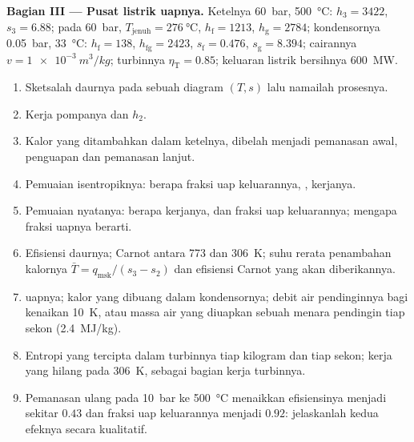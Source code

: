 \begin{problem}
\textbf{Bagian III --- Pusat listrik uapnya.}
Ketelnya \qty{60}{bar}, \qty{500}{\celsius}: $h_3 = 3422$, $s_3 = 6.88$; pada
\qty{60}{bar}, $T_{\text{jenuh}} = \qty{276}{\celsius}$, $h_{\text{f}} = 1213$,
$h_{\text{g}} = 2784$; kondensornya \qty{0.05}{bar}, \qty{33}{\celsius}:
$h_{\text{f}} = 138$, $h_{\text{fg}} = 2423$, $s_{\text{f}} = 0.476$, $s_{\text{g}} =
8.394$; cairannya $v = \qty{1e-3}{m^3/kg}$; turbinnya $\eta_{\text{T}} = 0.85$;
keluaran listrik bersihnya \qty{600}{MW}.
\begin{enumerate}[resume]
  \item Sketsalah daurnya pada sebuah diagram $(T,s)$ lalu namailah prosesnya.
  \item Kerja pompanya dan $h_2$.
  \item Kalor yang ditambahkan dalam ketelnya, dibelah menjadi pemanasan awal, penguapan
        dan pemanasan lanjut.
  \item Pemuaian isentropiknya: berapa fraksi uap keluarannya, , kerjanya.
  \item Pemuaian nyatanya: berapa kerjanya,  dan fraksi uap keluarannya; mengapa
        fraksi uapnya berarti.
  \item Efisiensi daurnya; Carnot antara \qty{773}{} dan \qty{306}{K};
        suhu rerata penambahan kalornya $\bar T = q_{\text{msk}}/(s_3
        - s_2)$ dan efisiensi Carnot yang akan diberikannya.
  \item {} uapnya; kalor yang dibuang dalam kondensornya; debit air
        pendinginnya bagi kenaikan \qty{10}{K}, atau massa air yang diuapkan
        sebuah menara pendingin tiap sekon (\qty{2.4}{MJ/kg}).
  \item Entropi yang tercipta dalam turbinnya tiap kilogram dan tiap sekon;
        kerja yang hilang pada \qty{306}{K}, sebagai bagian kerja
        turbinnya.
  \item Pemanasan ulang pada \qty{10}{bar} ke \qty{500}{\celsius} menaikkan
        efisiensinya menjadi sekitar $0.43$ dan fraksi uap keluarannya menjadi $0.92$:
        jelaskanlah kedua efeknya secara kualitatif.
\end{enumerate}


\end{problem}
